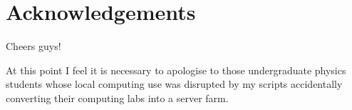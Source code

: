 \chapter*{Acknowledgements}

\noindent

\normalsize

Cheers guys!

At this point I feel it is necessary
to apologise to those undergraduate physics students whose local computing
use was disrupted by my scripts accidentally converting their computing labs
into a server farm.

